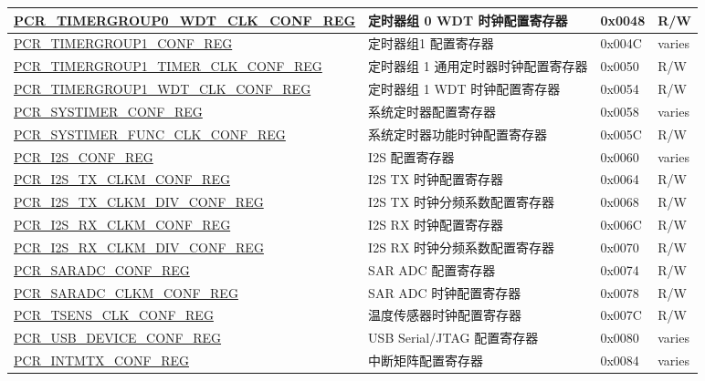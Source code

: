 \begin{longtable}{ | p{7cm} | p{6.2cm} | p{1.3cm} | p{1cm} | }
\hyperref[regdesc:PCRTIMERGROUP0WDTCLKCONFREG]{PCR\_TIMERGROUP0\_WDT\_CLK\_CONF\_REG} & 定时器组 0 WDT 时钟配置寄存器 & 0x0048 & R/W \\ \hline
\hyperref[regdesc:PCRTIMERGROUP1CONFREG]{PCR\_TIMERGROUP1\_CONF\_REG} & 定时器组1 配置寄存器 & 0x004C & varies \\ \hline
\hyperref[regdesc:PCRTIMERGROUP1TIMERCLKCONFREG]{PCR\_TIMERGROUP1\_TIMER\_CLK\_CONF\_REG} & 定时器组 1 通用定时器时钟配置寄存器 & 0x0050 & R/W \\ \hline
\hyperref[regdesc:PCRTIMERGROUP1WDTCLKCONFREG]{PCR\_TIMERGROUP1\_WDT\_CLK\_CONF\_REG} & 定时器组 1 WDT 时钟配置寄存器 & 0x0054 & R/W \\ \hline
\hyperref[regdesc:PCRSYSTIMERCONFREG]{PCR\_SYSTIMER\_CONF\_REG} & 系统定时器配置寄存器 & 0x0058 & varies \\ \hline
\hyperref[regdesc:PCRSYSTIMERFUNCCLKCONFREG]{PCR\_SYSTIMER\_FUNC\_CLK\_CONF\_REG} & 系统定时器功能时钟配置寄存器 & 0x005C & R/W \\ \hline
\hyperref[regdesc:PCRI2SCONFREG]{PCR\_I2S\_CONF\_REG} & I2S 配置寄存器 & 0x0060 & varies \\ \hline
\hyperref[regdesc:PCRI2STXCLKMCONFREG]{PCR\_I2S\_TX\_CLKM\_CONF\_REG} & I2S TX 时钟配置寄存器 & 0x0064 & R/W \\ \hline
\hyperref[regdesc:PCRI2STXCLKMDIVCONFREG]{PCR\_I2S\_TX\_CLKM\_DIV\_CONF\_REG} & I2S TX 时钟分频系数配置寄存器 & 0x0068 & R/W \\ \hline
\hyperref[regdesc:PCRI2SRXCLKMCONFREG]{PCR\_I2S\_RX\_CLKM\_CONF\_REG} & I2S RX 时钟配置寄存器 & 0x006C & R/W \\ \hline
\hyperref[regdesc:PCRI2SRXCLKMDIVCONFREG]{PCR\_I2S\_RX\_CLKM\_DIV\_CONF\_REG} & I2S RX 时钟分频系数配置寄存器 & 0x0070 & R/W \\ \hline
\hyperref[regdesc:PCRSARADCCONFREG]{PCR\_SARADC\_CONF\_REG} & SAR ADC 配置寄存器 & 0x0074 & R/W \\ \hline
\hyperref[regdesc:PCRSARADCCLKMCONFREG]{PCR\_SARADC\_CLKM\_CONF\_REG} & SAR ADC 时钟配置寄存器 & 0x0078 & R/W \\ \hline
\hyperref[regdesc:PCRTSENSCLKCONFREG]{PCR\_TSENS\_CLK\_CONF\_REG} & 温度传感器时钟配置寄存器 & 0x007C & R/W \\ \hline
\hyperref[regdesc:PCRUSBDEVICECONFREG]{PCR\_USB\_DEVICE\_CONF\_REG} & USB Serial/JTAG 配置寄存器 & 0x0080 & varies \\ \hline
\hyperref[regdesc:PCRINTMTXCONFREG]{PCR\_INTMTX\_CONF\_REG} & 中断矩阵配置寄存器 & 0x0084 & varies \\ \hline

\end{longtable}
